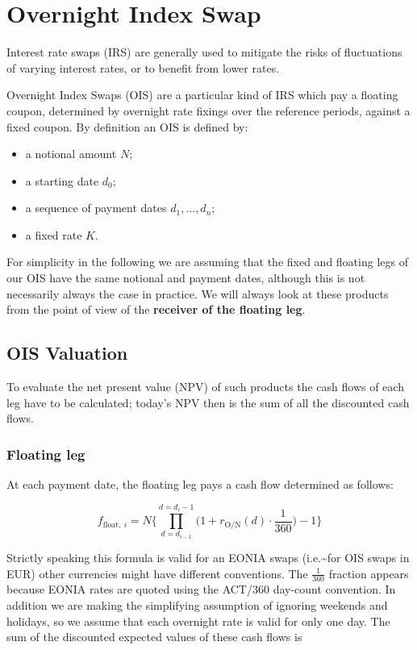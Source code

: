 \section{Overnight Index Swap}\label{overnight-index-swap}

Interest rate swaps (IRS) are generally used to mitigate the risks of
fluctuations of varying interest rates, or to benefit from lower rates.

Overnight Index Swaps (OIS) are a particular kind of IRS which pay a
floating coupon, determined by overnight rate fixings over the reference
periods, against a fixed coupon. By definition an OIS is defined by:

\begin{itemize}
\tightlist
\item
  a notional amount \(N\);
\item
  a starting date \(d_0\);
\item
  a sequence of payment dates \(d_1,...,d_n\);
\item
  a fixed rate \(K\).
\end{itemize}

For simplicity in the following we are assuming that the fixed and
floating legs of our OIS have the same notional and payment dates,
although this is not necessarily always the case in practice.
We will always look at these products from the point of view of the
\textbf{receiver of the floating leg}.

\subsection{OIS Valuation}\label{ois-valuation}
To evaluate the net present value (NPV) of such products the cash flows
of each leg have to be calculated; today's NPV then is the sum of all
the discounted cash flows.

\subsubsection{Floating leg}\label{floating-leg}

At each payment date, the floating leg pays a cash flow determined as
follows:

\begin{equation}
f_{\mathrm{float},~i} = N \Bigg\{\prod_{d=d_{i-1}}^{d=d_i-1}\Big(1+r_{\mathrm{O/N}}(d)\cdot\frac{1}{360}\Big) -1 \Bigg\}
\label{eq:floati_ois}
\end{equation}

Strictly speaking this formula is valid for an EONIA swaps
(i.e.\textasciitilde{}for OIS swaps in EUR) other currencies might have
different conventions. The \(\frac{1}{360}\) fraction appears because
EONIA rates are quoted using the ACT/360 day-count convention. In
addition we are making the simplifying assumption of ignoring weekends
and holidays, so we assume that each overnight rate is valid for only
one day. The sum of the discounted expected values of these cash flows
is

